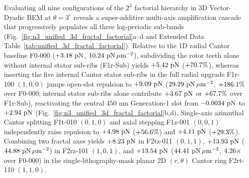 \documentclass[pdflatex,sn-nature]{sn-jnl}
\DeclareRobustCommand{\roundone}[1]{\fpeval{round(#1,1)}}
\DeclareRobustCommand{\roundtwo}[1]{\fpeval{round(#1,2)}}
\DeclareRobustCommand{\roundfour}[1]{\fpeval{round(#1,4)}}
\begin{document}
Evaluating all nine configurations of the $2^3$ factorial hierarchy in 3D Vector-Dyadic BEM at $\theta = 3^\circ$ reveals a super-additive multi-axis amplification cascade that progressively populates all three log-periodic sub-bands (Fig.~\ref{fig:n3_unified_3d_fractal_factorial}a--d and Extended Data Table~\ref{tab:unified_3d_fractal_factorial}). Relative to the 1D radial Cantor baseline F0-000 ($+\roundtwo{\NthreeUnithreedFzerozerozeroFzPn}\text{ pN}$, $\roundtwo{\NthreeUnithreedFzerozerozeroFa}\text{ pN}\,\mu\text{m}^{-2}$), subdividing the rotor teeth alone without internal stator sub-ribs (F1r-Sub) yields $+\roundtwo{\NthreeUnithreedFonerSubFzPn}\text{ pN}$ ($+\roundone{\NthreeUnithreedSingleEffectRSubPct}\%$), whereas inserting the five internal Cantor stator sub-ribs in the full radial upgrade F1r-100 $(1,0,0)$ jumps open-slot repulsion to $+\roundtwo{\NthreeUnithreedFonezerozeroRFzPn}\text{ pN}$ ($\roundtwo{\NthreeUnithreedFonezerozeroRFa}\text{ pN}\,\mu\text{m}^{-2}$, $+\roundone{\NthreeUnithreedSingleEffectRPct}\%$ over F0-000; internal stator sub-ribs alone contribute $+\roundtwo{\NthreeUnithreedStatorSubribGainPn}\text{ pN}$ or $+\roundone{\NthreeUnithreedStatorSubribGainPct}\%$ over F1r-Sub), reactivating the central $450\text{ nm}$ Generation-1 slot from $\roundfour{\NthreeUnithreedSlotfourFzerozerozeroPn}\text{ pN}$ to $+\roundtwo{\NthreeUnithreedSlotfourFonezerozeroPn}\text{ pN}$ (Fig.~\ref{fig:n3_unified_3d_fractal_factorial}b,d). Single-axis azimuthal Cantor splitting F1t-010 $(0,1,0)$ and axial stepping F1z-001 $(0,0,1)$ independently raise repulsion to $+\roundtwo{\NthreeUnithreedFzeroonezeroThetaFzPn}\text{ pN}$ ($+\roundone{\NthreeUnithreedSingleEffectThetaPct}\%$) and $+\roundtwo{\NthreeUnithreedFzerozerooneZFzPn}\text{ pN}$ ($+\roundone{\NthreeUnithreedSingleEffectZPct}\%$). Combining two fractal axes yields $+\roundtwo{\NthreeUnithreedFzerooneoneThetazFzPn}\text{ pN}$ in F2tz-011 $(0,1,1)$, $+\roundtwo{\NthreeUnithreedFonezerooneRzFzPn}\text{ pN}$ ($\roundtwo{\NthreeUnithreedFonezerooneRzFa}\text{ pN}\,\mu\text{m}^{-2}$) in F2rz-101 $(1,0,1)$, and $+\roundtwo{\NthreeUnithreedFoneonezeroRthetaPlanarFzPn}\text{ pN}$ ($\roundtwo{\NthreeUnithreedFoneonezeroRthetaPlanarFa}\text{ pN}\,\mu\text{m}^{-2}$, $\roundtwo{\NthreeUnithreedRatioFoneonezeroPlanarVsFzerozerozero}\times$ over F0-000) in the single-lithography-mask planar 2D $(r,\theta)$ Cantor ring F2rt-110 $(1,1,0)$.
\end{document}
